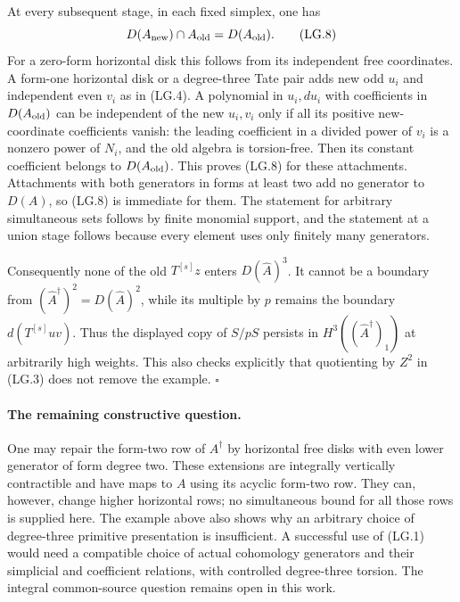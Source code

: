 At every subsequent stage, in each fixed simplex, one has
\[
             D(A_{\rm new})\cap A_{\rm old}=D(A_{\rm old}).
 \tag{LG.8}
\]
For a zero-form horizontal disk this follows from its independent
free coordinates. A form-one horizontal disk or a degree-three
Tate pair adds new odd \(u_i\) and independent even \(v_i\)
as in (LG.4). A polynomial in \(u_i,du_i\) with coefficients
in \(D(A_{\rm old})\) can be independent of the new \(u_i,v_i\)
only if all its positive new-coordinate coefficients vanish:
the leading coefficient in a divided power of \(v_i\) is a
nonzero power of \(N_i\), and the old algebra is torsion-free.
Then its constant coefficient belongs to \(D(A_{\rm old})\).
This proves (LG.8) for these attachments. Attachments with both
generators in forms at least two add no generator to \(D(A)\),
so (LG.8) is immediate for them. The statement for arbitrary
simultaneous sets follows by finite monomial support, and the
statement at a union stage follows because every element uses
only finitely many generators.

Consequently none of the old \(T^{[s]}z\) enters
\(D(\widehat A)^3\). It cannot be a boundary from
\((\widehat A^\dagger)^2=D(\widehat A)^2\), while its multiple
by \(p\) remains the boundary \(d(T^{[s]}uv)\). Thus the
displayed copy of \(S/pS\) persists in
\(H^3((\widehat A^\dagger)_1)\) at arbitrarily high weights.
This also checks explicitly that quotienting by \(Z^2\) in
(LG.3) does not remove the example. \(\square\)

\paragraph{The remaining constructive question.}
One may repair the form-two row of \(A^\dagger\) by horizontal
free disks with even lower generator of form degree two. These
extensions are integrally vertically contractible and have maps
to \(A\) using its acyclic form-two row. They can, however,
change higher horizontal rows; no simultaneous bound for all
those rows is supplied here. The example above also shows why
an arbitrary choice of degree-three primitive presentation is
insufficient. A successful use of (LG.1) would need a compatible
choice of actual cohomology generators and their simplicial and
coefficient relations, with controlled degree-three torsion.
The integral common-source question remains open in this work.
